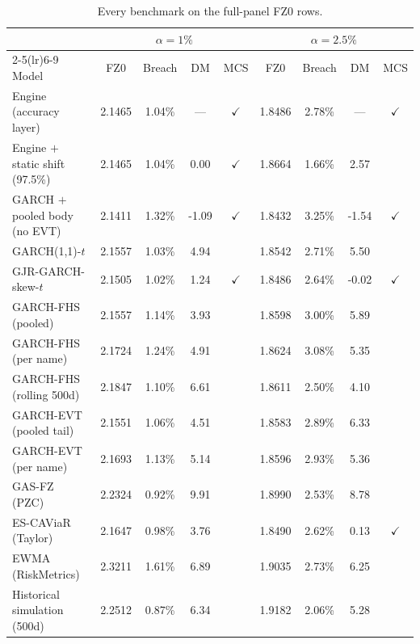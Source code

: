 \documentclass[11pt]{article}
\begin{document}
\begin{table}[htbp]
\centering
\begin{threeparttable}
\caption{Every benchmark on the full-panel FZ0 rows.}
\label{tab:bench-fz0}
\footnotesize
\begin{tabular}{lcccccccc}
\toprule
& \multicolumn{4}{c}{$\alpha=1\%$} & \multicolumn{4}{c}{$\alpha=2.5\%$} \\
\cmidrule(lr){2-5}\cmidrule(lr){6-9}
Model & FZ0 & Breach & DM & MCS & FZ0 & Breach & DM & MCS \\
\midrule
Engine (accuracy layer) & 2.1465 & 1.04\% & --- & $\checkmark$ & 1.8486 & 2.78\% & --- & $\checkmark$ \\
Engine $+$ static shift (97.5\%) & 2.1465 & 1.04\% & 0.00 & $\checkmark$ & 1.8664 & 1.66\% & 2.57 &  \\
GARCH $+$ pooled body (no EVT) & 2.1411 & 1.32\% & -1.09 & $\checkmark$ & 1.8432 & 3.25\% & -1.54 & $\checkmark$ \\
GARCH(1,1)-$t$ & 2.1557 & 1.03\% & 4.94 &  & 1.8542 & 2.71\% & 5.50 &  \\
GJR-GARCH-skew-$t$ & 2.1505 & 1.02\% & 1.24 & $\checkmark$ & 1.8486 & 2.64\% & -0.02 & $\checkmark$ \\
GARCH-FHS (pooled) & 2.1557 & 1.14\% & 3.93 &  & 1.8598 & 3.00\% & 5.89 &  \\
GARCH-FHS (per name) & 2.1724 & 1.24\% & 4.91 &  & 1.8624 & 3.08\% & 5.35 &  \\
GARCH-FHS (rolling 500d) & 2.1847 & 1.10\% & 6.61 &  & 1.8611 & 2.50\% & 4.10 &  \\
GARCH-EVT (pooled tail) & 2.1551 & 1.06\% & 4.51 &  & 1.8583 & 2.89\% & 6.33 &  \\
GARCH-EVT (per name) & 2.1693 & 1.13\% & 5.14 &  & 1.8596 & 2.93\% & 5.36 &  \\
GAS-FZ (PZC) & 2.2324 & 0.92\% & 9.91 &  & 1.8990 & 2.53\% & 8.78 &  \\
ES-CAViaR (Taylor) & 2.1647 & 0.98\% & 3.76 &  & 1.8490 & 2.62\% & 0.13 & $\checkmark$ \\
EWMA (RiskMetrics) & 2.3211 & 1.61\% & 6.89 &  & 1.9035 & 2.73\% & 6.25 &  \\
Historical simulation (500d) & 2.2512 & 0.87\% & 6.34 &  & 1.9182 & 2.06\% & 5.28 &  \\
\bottomrule
\end{tabular}
\begin{tablenotes}\footnotesize

\end{tablenotes}
\end{threeparttable}
\end{table}
\end{document}

